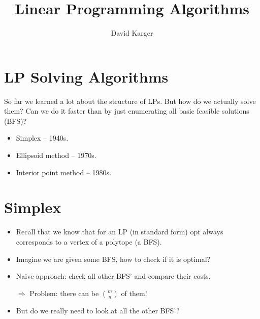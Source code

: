 \documentclass{article}
\title{Linear Programming Algorithms}
\author{David Karger}
\begin{document}
\section{LP Solving Algorithms}

So far we learned a lot about the structure of LPs. But how do we actually solve them?
Can we do it faster than by just enumerating all basic feasible solutions (BFS)?

\begin{itemize}
\item Simplex -- 1940s.
\item Ellipsoid method -- 1970s.
\item Interior point method -- 1980s. 
\end{itemize}

\section{Simplex}

\begin{itemize}
\item Recall that we know that for an LP (in standard form) opt always corresponds to a vertex of a polytope (a BFS).
\item Imagine we are given some BFS, how to check if it is optimal? 
\item Naive approach: check all other BFS' and compare their costs. 

$\Rightarrow$ Problem: there can be $m \choose n$ of them! 

\item But do we really need to look at all the other BFS'?

\end{itemize}
\end{document}
